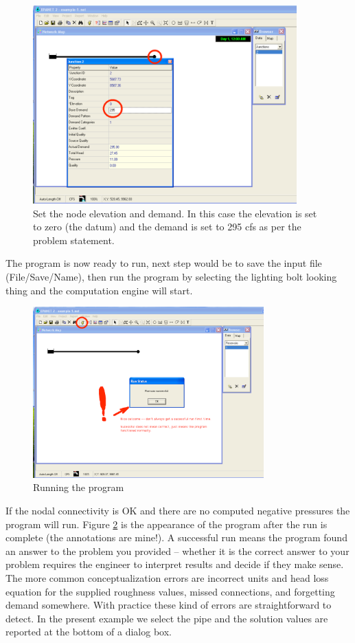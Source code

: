 \begin{figure}[htbp] %
   \centering
   \includegraphics[width=4in]{set-demand.pdf} 
   \caption{Set the node elevation and demand.  In this case the elevation is set to zero (the datum) and the demand is set to 295 cfs as per the problem statement.}
   \label{fig:set-demand}
\end{figure}
The program is now ready to run, next step would be to save the input file (File/Save/Name), then run the program by selecting the lighting bolt looking thing and the computation engine will start.  

\begin{figure}[htbp] %
   \centering
   \includegraphics[width=3.5in]{run-program.pdf} 
   \caption{Running the program}
   \label{fig:run-program}
\end{figure}

If the nodal connectivity is OK and there are no computed negative pressures the program will run.   Figure \ref{fig:run-program}  is the appearance of the program after the run is complete (the annotations are mine!).
A successful run means the program found an answer to the problem you provided -- whether it is the correct answer to your problem requires the engineer to interpret results and decide if they make sense.  The more common conceptualization errors are incorrect units and head loss equation for the supplied roughness values, missed connections, and forgetting demand somewhere.  With practice these kind of errors are straightforward to detect.   In the present example we select the pipe and the solution values are reported at the bottom of a dialog box.


